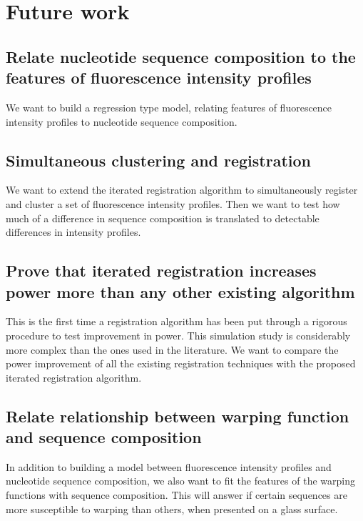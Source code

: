 \section{Future work}

\subsection{Relate nucleotide sequence composition to the features of fluorescence intensity profiles}
We want to build a regression type model, relating features of fluorescence intensity profiles to nucleotide sequence composition. 

\subsection{Simultaneous clustering and registration}
We want to extend the iterated registration algorithm to simultaneously register and cluster a set of fluorescence intensity profiles. Then we want to test how much of a difference in sequence composition is translated to detectable differences in intensity profiles. 

\subsection{Prove that iterated registration increases power more than any other existing algorithm}
This is the first time a registration algorithm has been put through a rigorous procedure to test improvement in power. This simulation study is considerably more complex than the ones used in the literature. We want to compare the power improvement of all the existing registration techniques with the proposed iterated registration algorithm. 

\subsection{Relate relationship between warping function and sequence composition}
In addition to building a model between fluorescence intensity profiles and nucleotide sequence composition, we also want to fit the features of the warping functions with sequence composition. This will answer if certain sequences are more susceptible to warping than others, when presented on a glass surface.

